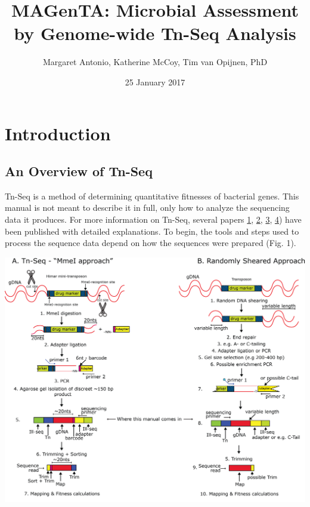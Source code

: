 \documentclass[11pt,]{article}
\title{MAGenTA: Microbial Assessment by Genome-wide Tn-Seq Analysis}
\author{Margaret Antonio, Katherine McCoy, Tim van Opijnen, PhD}
\date{25 January 2017}
\begin{document}
\maketitle

{
\hypersetup{linkcolor=black}
\setcounter{tocdepth}{2}
\tableofcontents
}
\newpage

\section{Introduction}\label{introduction}

\subsection{An Overview of Tn-Seq}\label{an-overview-of-tn-seq}

Tn-Seq is a method of determining quantitative fitnesses of bacterial
genes. This manual is not meant to describe it in full, only how to
analyze the sequencing data it produces. For more information on Tn-Seq,
several papers
\href{http://www.nature.com/nmeth/journal/v6/n10/abs/nmeth.1377.html}{1},
\href{http://www.nature.com/nrmicro/journal/v11/n7/abs/nrmicro3033.html}{2},
\href{http://www.ncbi.nlm.nih.gov/pmc/articles/PMC3514683/}{3},
\href{http://journals.plos.org/plospathogens/article?id=10.1371/journal.ppat.1005869}{4})
have been published with detailed explanations. To begin, the tools and
steps used to process the sequence data depend on how the sequences were
prepared (Fig. 1).

\centerline{\includegraphics[width=0.8\linewidth]{figs/sequence.png}}
\end{document}
